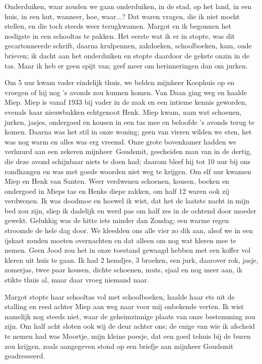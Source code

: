\documentclass{book}
\begin{document}
Onderduiken, waar zouden we gaan onderduiken, in de stad, op het land,
in een huis, in een hut, wanneer, hoe, waar...? Dat waren vragen, die ik
niet mocht stellen, en die toch steeds weer terugkwamen. Margot en ik
begonnen het nodigste in een schooltas te pakken. Het eerste wat ik er
in stopte, was dit gecartonneerde schrift, daarna krulpennen, zakdoeken,
schoolboeken, kam, oude brieven; ik dacht aan het onderduiken en stopte
daardoor de gekste onzin in de tas. Maar ik heb er geen spijt van; geef
meer om herinneringen dan om jurken.

Om 5 uur kwam vader eindelijk thuis, we belden mijnheer Koophuis op en
vroegen of hij nog 's avonds zou kunnen komen. Van Daan ging weg en
haalde Miep. Miep is vanaf 1933 bij vader in de zaak en een intieme
kennis geworden, evenals haar nieuwbakken echtgenoot Henk. Miep kwam,
nam wat schoenen, jurken, jasjes, ondergoed en kousen in een tas mee en
beloofde 's avonds terug te komen. Daarna was het stil in onze woning;
geen van vieren wilden we eten, het was nog warm en alles was erg
vreemd. Onze grote bovenkamer hadden we verhuurd aan een zekeren
mijnheer~Goudsmit, gescheiden man van in de dertig, die deze avond
schijnbaar niets te doen had; daarom bleef hij tot 10 uur bij ons
rondhangen en was met goede woorden niet weg te krijgen. Om elf uur
kwamen Miep en Henk van Santen. Weer verdwenen schoenen, kousen, boeken
en ondergoed in Mieps tas en Henks diepe zakken, om half 12 waren ook
zij verdwenen. Ik was doodmoe en hoewel ik wist, dat het de laatste
nacht in mijn bed zou zijn, sliep ik dadelijk en werd pas om half zes in
de ochtend door moeder gewekt. Gelukkig was de hitte iets minder dan
Zondag; een warme regen stroomde de hele dag door. We kleedden ons alle
vier zo dik aan, alsof we in een ijskast zouden moeten overnachten en
dat alleen om nog wat kleren mee te nemen. Geen Jood zou het in onze
toestand gewaagd hebben met een koffer vol kleren uit huis te gaan. Ik
had 2 hemdjes, 3 broeken, een jurk, daarover rok, jasje, zomerjas, twee
paar kousen, dichte schoenen, muts, sjaal en nog meer aan, ik stikte
thuis al, maar daar vroeg niemand naar.

Margot stopte haar schooltas vol met schoolboeken, haalde haar ets uit
de stalling en reed achter Miep aan weg naar voor mij onbekende verten.
Ik wist namelijk nog steeds niet, waar de geheimzinnige plaats van onze
bestemming zou zijn. Om half acht sloten ook wij de deur achter ons; de
enige van wie ik afscheid te nemen had was Moortje, mijn kleine poesje,
dat een goed tehuis bij de buren zou krijgen, zoals aangegeven stond op
een briefje aan mijnheer Goudsmit geadresseerd.
\end{document}
